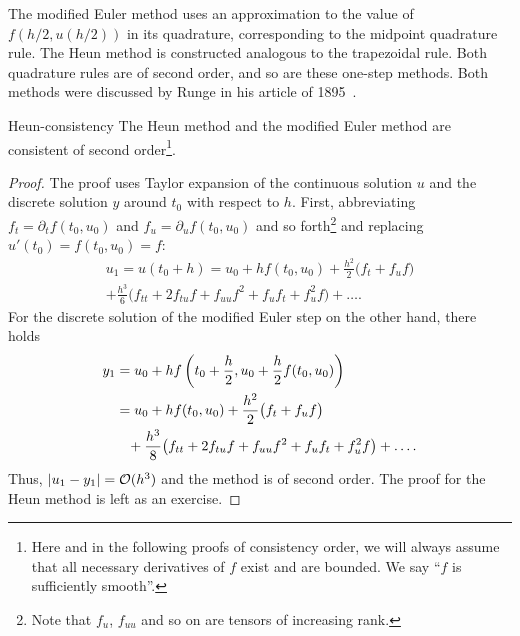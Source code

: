 

\begin{remark}
  The modified Euler method uses an approximation to the value of
  $f(h/2, u(h/2))$ in its quadrature, corresponding to the midpoint
  quadrature rule. The Heun method is constructed analogous to the
  trapezoidal rule. Both quadrature rules are of second order, and so
  are these one-step methods.  Both methods were discussed by Runge in
  his article of 1895~\cite{Runge95}.
\end{remark}

\begin{Lemma}{Heun-consistency}
  The Heun method and the modified Euler method are consistent of second
  order\footnote{Here and in the following proofs of consistency
    order, we will always assume that all necessary derivatives of $f$
  exist and are bounded. We say ``$f$ is sufficiently smooth''.}.
\end{Lemma}

\begin{proof}
  The proof uses Taylor expansion of the continuous solution $u$ and
  the discrete solution $y$ around $t_0$ with respect to $h$. First,
  abbreviating $f_t = \partial_t f(t_0,u_0)$ and
  $f_u = \partial_u f(t_0,u_0)$ and so forth\footnote{Note that $f_u$,
    $f_{u u}$ and so on are tensors of increasing rank.} and replacing
  $u'(t_0)=f(t_0,u_0) = f$:
  \begin{multline}
    \label{eq:explicit:4}
    u_1 = u(t_0+h) = u_0 + h f(t_0, u_0)
    + \frac{h^2}2\bigl(f_t + f_u f\bigr)
    \\
    + \frac{h^3}6\bigl(f_{t t}+2f_{t u}f+f_{u u}f^2+f_u f_t+f_u^2f\bigr)
    + \dots.
  \end{multline}
  For the discrete solution of the modified Euler step on the other
  hand, there holds
  \begin{align*}
    y_1 &= u_0 + h f\left(t_0+\frac h2, u_0+\frac h2 f(t_0,u_0)\right)
    \\
    &= u_0 + h f(t_0, u_0) + \frac{h^2}2 \bigl(f_t + f_u f\bigr)
    \\&\hphantom{...}
      + \frac{h^3}8\bigl(f_{t t}+2f_{t u}f+f_{u u}f^2+f_u f_t+f_u^2f\bigr)
        +\dots.
  \end{align*}
  Thus, $\lvert u_1-y_1\rvert = \mathcal O(h^3)$ and the method is of second
  order. The proof for the Heun method is left as an exercise.
\end{proof}

